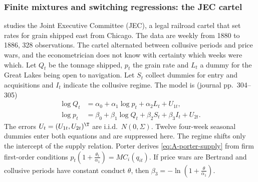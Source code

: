 \subsubsection*{Finite mixtures and switching regressions: the JEC cartel}

\citet{Porter1983} studies the Joint Executive Committee (JEC), a legal railroad cartel that set rates for grain shipped
east from Chicago. The data are weekly from 1880 to 1886, 328 observations. The cartel alternated between collusive
periods and price wars, and the econometrician does not know with certainty which weeks were which. Let $Q_t$ be the
tonnage shipped, $p_t$ the grain rate and $L_t$ a dummy for the Great Lakes being open to navigation. Let $S_t$ collect
dummies for entry and acquisitions and $I_t$ indicate the collusive regime. The model is (journal pp.~304--305)
\begin{align}
  \log Q_t &= \alpha_0 + \alpha_1\log p_t + \alpha_2L_t + U_{1t},\label{eq:A-porter-demand}\\
  \log p_t &= \beta_0 + \beta_1\log Q_t + \beta_2S_t + \beta_3I_t + U_{2t}.\label{eq:A-porter-supply}
\end{align}
The errors $U_t = (U_{1t}, U_{2t})^\T$ are i.i.d.\ $N(0, \Sigma)$. Twelve four-week seasonal dummies enter both equations
and are suppressed here. The regime shifts only the intercept of the supply relation. Porter derives
\eqref{eq:A-porter-supply} from firm first-order conditions $p_t(1 + \frac{\theta_t}{\alpha_1}) = MC_i(q_{it})$. If price wars
are Bertrand and collusive periods have constant conduct $\theta$, then $\beta_3 = -\ln(1 + \frac{\theta}{\alpha_1})$.

